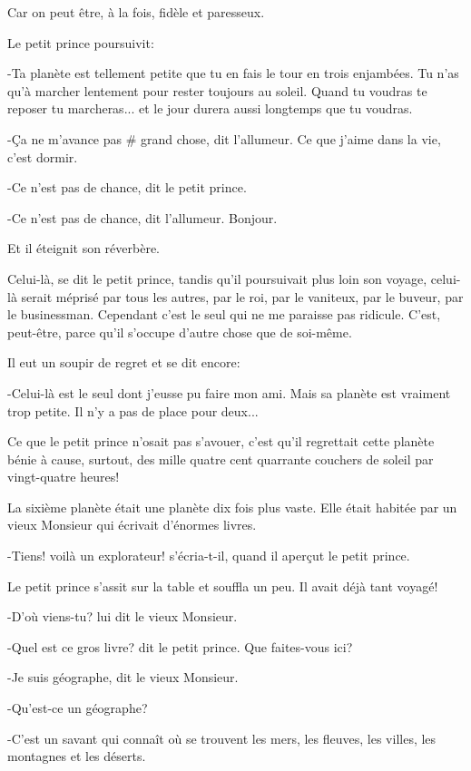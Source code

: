 \documentclass{report}
\begin{document}
Car on peut être, à la fois, fidèle et paresseux.

Le petit prince poursuivit:

-Ta planète est tellement petite que tu en fais le tour en trois enjambées. Tu n'as qu'à marcher lentement pour rester toujours au soleil. Quand tu voudras te reposer tu marcheras... et le jour durera aussi longtemps que tu voudras.

-Ça ne m'avance pas \# grand chose, dit l'allumeur. Ce que j'aime dans la vie, c'est dormir.

-Ce n'est pas de chance, dit le petit prince.

-Ce n'est pas de chance, dit l'allumeur. Bonjour.

Et il éteignit son réverbère.

Celui-là, se dit le petit prince, tandis qu'il poursuivait plus loin son voyage, celui-là serait méprisé par tous les autres, par le roi, par le vaniteux, par le buveur, par le businessman. Cependant c'est le seul qui ne me paraisse pas ridicule. C'est, peut-être, parce qu'il s'occupe d'autre chose que de soi-même.

Il eut un soupir de regret et se dit encore:

-Celui-là est le seul dont j'eusse pu faire mon ami. Mais sa planète est vraiment trop petite. Il n'y a pas de place pour deux...

Ce que le petit prince n'osait pas s'avouer, c'est qu'il regrettait cette planète bénie à cause, surtout, des mille quatre cent quarrante couchers de soleil par vingt-quatre heures!
\parachapter{} %

La sixième planète était une planète dix fois plus vaste. Elle était habitée par un vieux Monsieur qui écrivait d'énormes livres.

-Tiens! voilà un explorateur! s'écria-t-il, quand il aperçut le petit prince.

Le petit prince s'assit sur la table et souffla un peu. Il avait déjà tant voyagé!


-D'où viens-tu? lui dit le vieux Monsieur.

-Quel est ce gros livre? dit le petit prince. Que faites-vous ici?

-Je suis géographe, dit le vieux Monsieur.

-Qu'est-ce un géographe?

-C'est un savant qui connaît où se trouvent les mers, les fleuves, les villes, les montagnes et les déserts.
\end{document}
